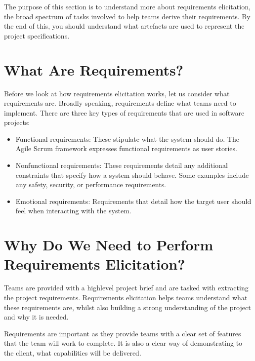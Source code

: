 \documentclass[letterpaper,10pt,english]{jupyterBook}
\begin{document}
\sphinxAtStartPar
The purpose of this section is to understand more about requirements
elicitation, the broad spectrum of tasks involved to help teams derive
their requirements. By the end of this, you should understand what
artefacts are used to represent the project specifications.


\section{What Are Requirements?}
\label{\detokenize{chapter_8/requirements_elicitation:what-are-requirements}}
\sphinxAtStartPar
Before we look at how requirements elicitation works, let us consider
what requirements are. Broadly speaking, requirements define what teams
need to implement. There are three key types of requirements that are
used in software projects:
\begin{itemize}
\item {} 
\sphinxAtStartPar
Functional requirements: These stipulate what the system should do.
The Agile Scrum framework expresses functional requirements as user
stories.

\item {} 
\sphinxAtStartPar
Non\sphinxhyphen{}functional requirements: These requirements detail any
additional constraints that specify how a system should behave. Some
examples include any safety, security, or performance requirements.

\item {} 
\sphinxAtStartPar
Emotional requirements: Requirements that detail how the target user
should feel when interacting with the system.

\end{itemize}


\section{Why Do We Need to Perform Requirements Elicitation?}
\label{\detokenize{chapter_8/requirements_elicitation:why-do-we-need-to-perform-requirements-elicitation}}
\sphinxAtStartPar
Teams are provided with a high\sphinxhyphen{}level project brief and are tasked with
extracting the project requirements. Requirements elicitation helps
teams understand what these requirements are, whilst also building a
strong understanding of the project and why it is needed.

\sphinxAtStartPar
Requirements are important as they provide teams with a clear set of
features that the team will work to complete. It is also a clear way of
demonstrating to the client, what capabilities will be delivered.
\end{document}
